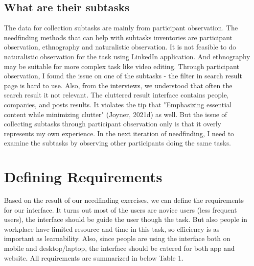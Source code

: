 \documentclass[
	letterpaper, %
]{jdf}
\begin{document}
\subsection{What are their subtasks}
The data for collection subtasks are mainly from participant observation. The needfinding methods that can help with subtasks inventories are participant observation, ethnography and naturalistic observation. It is not feasible to do naturalistic observation for the task using LinkedIn application. And ethnography may be suitable for more complex task like video editing. Through participant observation, I found the issue on one of the subtasks - the filter in search result page is hard to use. Also, from the interviews, we understood that often the search result it not relevant. The cluttered result interface contains people, companies, and posts results. It violates the tip that "Emphasizing essential content while minimizing clutter" (Joyner, 2021d) as well. But the issue of collecting subtasks through participant observation only is that it overly represents my own experience. In the next iteration of needfinding, I need to examine the subtasks by observing other participants doing the same tasks.

\section{Defining Requirements}
Based on the result of our needfinding exercises, we can define the requirements for our interface. It turns out most of the users are novice users (less frequent users), the interface should be guide the user though the task. But also people in workplace have limited resource and time in this task, so efficiency is as important as learnability. Also, since people are using the interface both on mobile and desktop/laptop, the interface should be catered for both app and website. All requirements are summarized in below Table 1.
\end{document}
